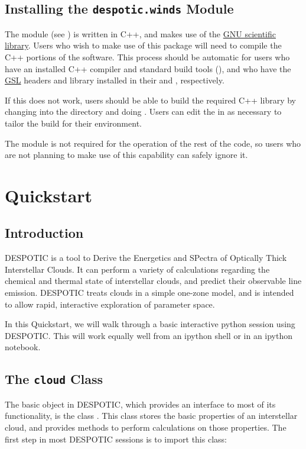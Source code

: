 \documentclass[letterpaper,10pt,english]{sphinxmanual}
\begin{document}
\section{Installing the \texttt{despotic.winds} Module}
\label{installation:ssec-winds-installation}\label{installation:installing-the-despotic-winds-module}
The  module (see {\hyperref[winds:sec\string-winds]{}}) is written in
C++, and makes use of the \href{http://www.gnu.org/software/gsl/}{GNU scientific library}. Users who wish to make use of
this package will need to compile the C++ portions of the
software. This process should be automatic for users who have an
installed C++ compiler and standard build tools (), and who
have the \href{http://www.gnu.org/software/gsl/}{GSL} headers and library
installed in their  and ,
respectively.

If this does not work, users should be able to build the required C++
library by changing into the  directory and doing
. Users can edit the  in  as
necessary to tailor the build for their environment.

The  module is not required for the operation of the rest of
the code, so users who are not planning to make use of this capability
can safely ignore it.


\chapter{Quickstart}
\label{quickstart::doc}\label{quickstart:quickstart}

\section{Introduction}
\label{quickstart:introduction}
DESPOTIC is a tool to Derive the Energetics and SPectra of
Optically Thick Interstellar Clouds. It can perform a
variety of calculations regarding the chemical and thermal state of
interstellar clouds, and predict their observable line
emission. DESPOTIC treats clouds in a simple one-zone model, and is
intended to allow rapid, interactive exploration of parameter space.

In this Quickstart, we will walk through a basic interactive python
session using DESPOTIC. This will work equally well from an ipython
shell or in an ipython notebook.


\section{The \texttt{cloud} Class}
\label{quickstart:the-cloud-class}
The basic object in DESPOTIC, which provides an interface to most of
its functionality, is the class . This class stores the basic
properties of an interstellar cloud, and provides methods to perform
calculations on those properties. The first step in most DESPOTIC
sessions is to import this class:
\end{document}
